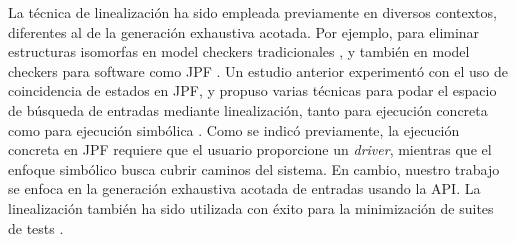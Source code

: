 La técnica de linealización ha sido empleada previamente en diversos contextos,
diferentes al de la generación exhaustiva acotada. Por ejemplo, para eliminar
estructuras isomorfas en model checkers tradicionales \cite{Iosif02,Robby03}, y también 
en model checkers para software como \textsf{JPF} \cite{Visser06}. Un estudio
anterior experimentó con el uso de coincidencia de estados en \textsf{JPF}, y propuso varias técnicas 
para podar el espacio de búsqueda de entradas mediante linealización, tanto para
ejecución concreta como para ejecución simbólica \cite{Visser06}. 
Como se indicó previamente, la ejecución concreta en \textsf{JPF} requiere que el usuario proporcione un \emph{driver}, 
mientras que el enfoque simbólico busca cubrir caminos del sistema. En cambio, nuestro trabajo se enfoca en la 
generación exhaustiva acotada de entradas usando la API. 
La linealización también ha sido utilizada con éxito para la minimización de suites de tests \cite{Xie04}.


